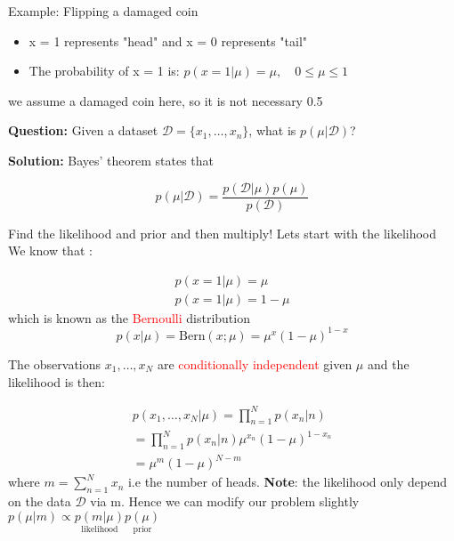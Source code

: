 \begin{example}{Example: Flipping a damaged coin}
    \begin{itemize}
        \item x = 1 represents "head" and x = 0 represents "tail"
        \item The probability of x = 1 is:
            $p(x=1 | \mu) = \mu, \quad 0 \le \mu  \le 1$
    \end{itemize}
    we assume a damaged coin here, so it is not necessary 0.5
    
    \vspace{2em}

    \textbf{Question:} Given a dataset $\mathcal{D} = \{ x_1, \dots, x_n\}$, what is $p(\mu|\mathcal{D})$?

    \vspace*{1em}

    \textbf{Solution:} Bayes' theorem states that

        \begin{equation}
            p(\mu|\mathcal{D}) = \frac{p (\mathcal{D}|\mu)p(\mu)} {p(\mathcal{D})} 
        \end{equation}

        Find the likelihood and prior and then multiply! Lets start with the likelihood \\
        We know that :

        \begin{equation}
        \begin{aligned}
            p(x=1|\mu) = \mu \\
            p(x=1|\mu) = 1 - \mu
        \end{aligned}
        \end{equation}
        which is known as the \textcolor{red}{Bernoulli} distribution
        \begin{equation}
            p(x|\mu) = \text{Bern}(x;\mu) = \mu^{x}(1-\mu)^{1-x}
        \end{equation}

        The observations $x_1, \dots, x_N$ are \textcolor{red}{conditionally independent} given $\mu$ and the likelihood is then:

        \begin{equation}
        \begin{aligned}
            p(x_1, \dots, x_N | \mu) = \prod_{n=1}^{N} p(x_n|n) \\
            = \prod_{n=1}^{N} p(x_n|n) \mu^{x_n}(1-\mu)^{1 - x_n} \\
            = \mu^{m} (1-\mu)^{N-m}
        \end{aligned}
        \end{equation}
        where $m = \sum_{n=1}^{N}x_n$ i.e the number of heads. \textbf{Note}: the likelihood only depend on the data $\mathcal{D}$ via m. 
        Hence we can modify our problem slightly $p (\mu|m) \propto \underset{\text{likelihood}}{p (m|\mu)} \underset{\text{prior}}{p(\mu)}$


\end{example}

